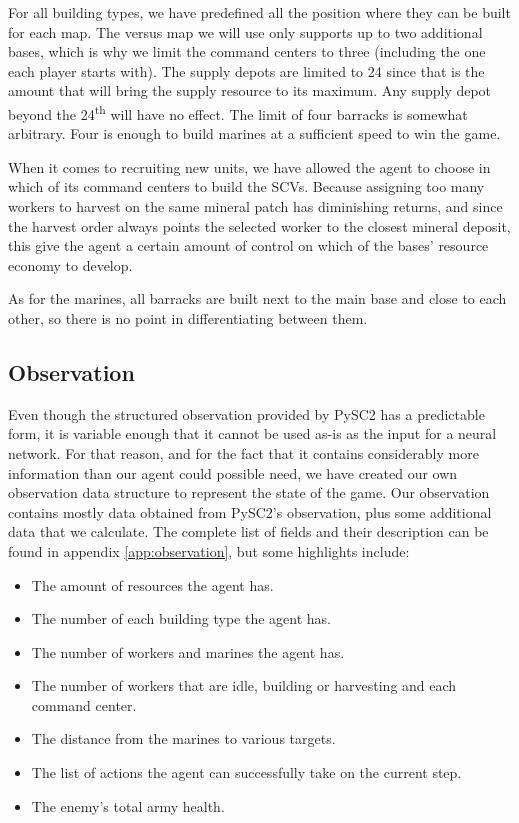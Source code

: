 For all building types, we have predefined all the position where they can be built for each map. The versus map we will use only supports up to two additional bases, which is why we limit the command centers to three (including the one each player starts with). The supply depots are limited to 24 since that is the amount that will bring the supply resource to its maximum. Any supply depot beyond the 24\textsuperscript{th} will have no effect. The limit of four barracks is somewhat arbitrary. Four is enough to build marines at a sufficient speed to win the game.

When it comes to recruiting new units, we have allowed the agent to choose in which of its command centers to build the SCVs. Because assigning too many workers to harvest on the same mineral patch has diminishing returns, and since the harvest order always points the selected worker to the closest mineral deposit, this give the agent a certain amount of control on which of the bases' resource economy to develop.

As for the marines, all barracks are built next to the main base and close to each other, so there is no point in differentiating between them.

\subsection{Observation}

Even though the structured observation provided by PySC2 has a predictable form, it is variable enough that it cannot be used as-is as the input for a neural network. For that reason, and for the fact that it contains considerably more information than our agent could possible need, we have created our own observation data structure to represent the state of the game. Our observation contains mostly data obtained from PySC2's observation, plus some additional data that we calculate. The complete list of fields and their description can be found in appendix \ref{app:observation}, but some highlights include:

\begin{itemize}
    \item The amount of resources the agent has.
    \item The number of each building type the agent has.
    \item The number of workers and marines the agent has.
    \item The number of workers that are idle, building or harvesting and each command center.
    \item The distance from the marines to various targets.
    \item The list of actions the agent can successfully take on the current step.
    \item The enemy's total army health.
\end{itemize}

